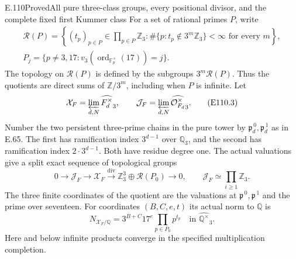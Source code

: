 \begin{statement}{E.110}{Proved}{All pure three-class groups, every positional divisor, and the complete fixed first Kummer class}
For a set of rational primes $P$, write
\[
 \begin{gathered}
 \mathcal R(P)=
 \left\{(t_p)_{p\in P}\in\prod_{p\in P}\mathbb Z_3:
       \#\{p:t_p\notin3^m\mathbb Z_3\}<\infty
                          \text{ for every }m\right\},\\
 P_j=\{p\ne3,17:v_3(\operatorname{ord}_{\mathbb F_p^\times}(17))=j\}.
 \end{gathered}
 \tag{E110.2}
\]
The topology on $\mathcal R(P)$ is defined by the subgroups
$3^m\mathcal R(P)$. Thus the quotients are direct sums of
$\mathbb Z/3^m$, including when $P$ is infinite.
Let
\[
 \mathcal X_F=\varprojlim_{d,N}\widehat{F_d^\times}_3,\qquad
 \mathcal J_F=\varprojlim_{d,N}
                   \widehat{\mathcal O_{F_d}^{\times}}_3 .
 \tag{E110.3}
\]
Number the two persistent three-prime chains in the pure tower by
$\mathfrak p_d^{\,0},\mathfrak p_d^{\,1}$ as in E.65. The first has
ramification index $3^{d-1}$ over $\mathbb Q_3$, and the second has
ramification index $2\cdot3^{d-1}$. Both have residue degree one.
The actual valuations give a split exact sequence of topological groups
\[
 0\longrightarrow\mathcal J_F\longrightarrow\mathcal X_F
   \xrightarrow{\operatorname{div}}
       \mathbb Z_3^3\oplus\mathcal R(P_0)\longrightarrow0,\qquad
 \mathcal J_F\simeq\prod_{i\ge1}\mathbb Z_3.
 \tag{E110.4}
\]
The three finite coordinates of the quotient are the valuations at
$\mathfrak p^{\,0},\mathfrak p^{\,1}$ and the prime over seventeen.
For coordinates $(B,C,e,t)$ its actual norm to $\mathbb Q$ is
\[
                N_{\mathcal X_F/\mathbb Q}
                 =3^{B+C}17^e\prod_{p\in P_0}p^{t_p}
                   \quad\text{in }\widehat{\mathbb Q^\times}_3 .
 \tag{E110.5}
\]
Here and below infinite products converge in the specified
multiplication completion.


\end{statement}
